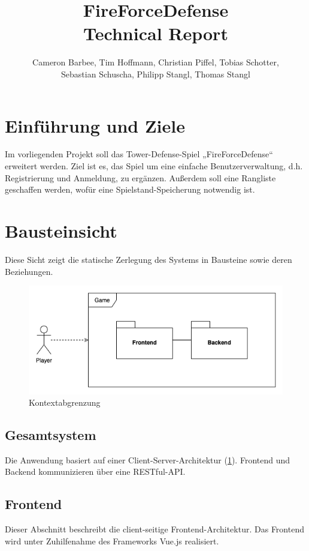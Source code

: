 \documentclass[letterpaper, 10 pt, conference]{ieeeconf}
\title{\LARGE
\textbf{FireForceDefense} \\ Technical Report
}
\author{Cameron Barbee, Tim Hoffmann,  Christian Piffel,  Tobias Schotter,\\  Sebastian Schuscha,  Philipp Stangl,  Thomas Stangl%
}
\begin{document}
\maketitle
\thispagestyle{empty}
\pagestyle{empty}

\section{Einführung und Ziele}

Im vorliegenden Projekt soll das Tower-Defense-Spiel „FireForceDefense“ erweitert werden.
Ziel ist es, das Spiel um eine einfache Benutzerverwaltung, d.h. Registrierung und Anmeldung, zu ergänzen.
Außerdem soll eine Rangliste geschaffen werden, wofür eine Spielstand-Speicherung notwendig ist.

\section{Bausteinsicht}
Diese Sicht zeigt die statische Zerlegung des Systems in Bausteine sowie
deren Beziehungen.  %

\begin{figure}[thpb]
      \centering
      \includegraphics[scale=0.38]{images/context}
      \caption{Kontextabgrenzung}
      \label{fig:context}
\end{figure}


\subsection{Gesamtsystem}
Die Anwendung basiert auf einer Client-Server-Architektur (\ref{fig:context}).
Frontend und Backend kommunizieren über eine RESTful-API.


\subsection{Frontend}
Dieser Abschnitt beschreibt die client-seitige Frontend-Architektur.
Das Frontend wird unter Zuhilfenahme des Frameworks Vue.js realisiert.
\end{document}
